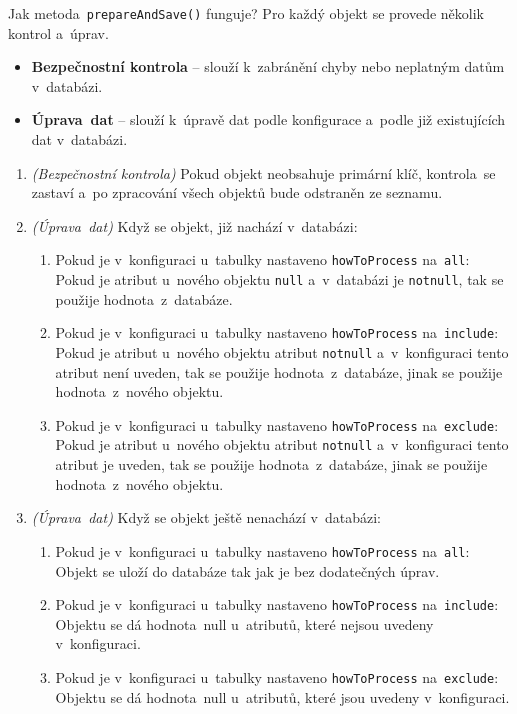 Jak metoda~\texttt{prepareAndSave()} funguje?
Pro každý objekt se provede několik kontrol a~úprav.

\begin{itemize}
    \item \textbf{Bezpečnostní kontrola} -- slouží k~zabránění chyby nebo neplatným datům v~databázi.
    \item \textbf{Úprava~dat} -- slouží k~úpravě dat podle konfigurace a~podle již existujících dat v~databázi.
\end{itemize}

\begin{enumerate}
    \item \textit{(Bezpečnostní kontrola)} Pokud objekt neobsahuje primární klíč, kontrola~se zastaví a~po 
    zpracování všech objektů bude odstraněn ze seznamu.
    
    \item \textit{(Úprava~dat)} Když se objekt, již nachází v~databázi:
    \begin{enumerate}
        \item Pokud je v~konfiguraci u~tabulky nastaveno \texttt{howToProcess} na~\texttt{all}:
        Pokud je atribut u~nového objektu \texttt{null} a~v~databázi je \texttt{notnull}, tak se použije hodnota~z~databáze.
        \item Pokud je v~konfiguraci u~tabulky nastaveno \texttt{howToProcess} na~\texttt{include}:
        Pokud je atribut u~nového objektu atribut \texttt{notnull} a~v~konfiguraci tento atribut není uveden, tak se použije hodnota~z~databáze,
        jinak se použije hodnota~z~nového objektu.
        \item Pokud je v~konfiguraci u~tabulky nastaveno \texttt{howToProcess} na~\texttt{exclude}:
        Pokud je atribut u~nového objektu atribut \texttt{notnull} a~v~konfiguraci tento atribut je uveden, tak se použije hodnota~z~databáze,
        jinak se použije hodnota~z~nového objektu.
    \end{enumerate}

    \item \textit{(Úprava~dat)} Když se objekt ještě nenachází v~databázi:
    \begin{enumerate}
        \item Pokud je v~konfiguraci u~tabulky nastaveno \texttt{howToProcess} na~\texttt{all}:
        Objekt se uloží do databáze tak jak je bez dodatečných úprav.
        \item Pokud je v~konfiguraci u~tabulky nastaveno \texttt{howToProcess} na~\texttt{include}:
        Objektu se dá hodnota~null u~atributů, které nejsou uvedeny v~konfiguraci.
        \item Pokud je v~konfiguraci u~tabulky nastaveno \texttt{howToProcess} na~\texttt{exclude}:
        Objektu se dá hodnota~null u~atributů, které jsou uvedeny v~konfiguraci.
    \end{enumerate}


\end{enumerate}
